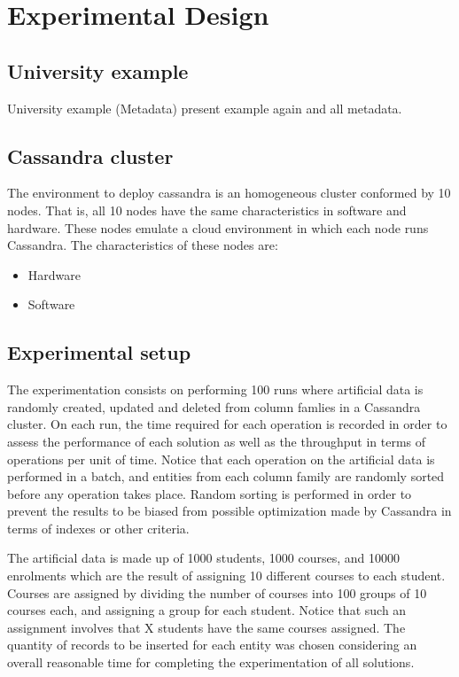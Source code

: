 \chapter{Experimental Design}



\section{University example}
University example (Metadata) present example again and all metadata.

\section{Cassandra cluster}

The environment to deploy cassandra is  an homogeneous cluster conformed by 10
nodes. That is, all 10 nodes have the same characteristics in software and
hardware. These nodes emulate a cloud environment in which each node runs
Cassandra. The characteristics of these nodes are:

\begin{itemize}
  \item Hardware
  \item Software
\end{itemize}




\section{Experimental setup}\label{s:exp:setup}


 The experimentation consists
on performing 100 runs where artificial data is randomly created, updated and deleted from column famlies in a Cassandra cluster.
On each run, the time required for each operation is recorded in order to assess the
performance of each solution as well as the throughput in terms of operations
per unit of time. Notice that each operation on the artificial data  is
performed in a batch, and entities from each column family are randomly sorted
before any operation takes place. Random sorting is performed in order to
prevent the results to be biased from possible optimization made by Cassandra in
terms of indexes or other criteria.
		
The artificial data is made up of 1000 students, 1000 courses, and 10000
enrolments which are the result of assigning 10 different courses to each
student. Courses are assigned by dividing the number of courses
into 100 groups of 10 courses each, and assigning a group for each student.
Notice that such an assignment involves that X students have the same courses
assigned. The quantity of records to be inserted for each entity was chosen
considering an overall reasonable time for completing the experimentation of all
solutions.
		
